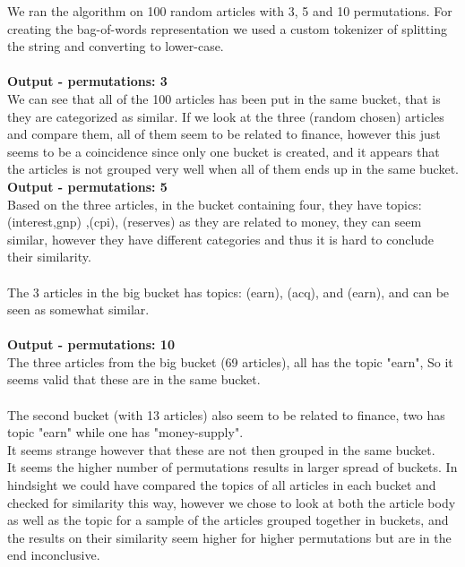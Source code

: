 \documentclass{article}
\begin{document}
We ran the algorithm on 100 random articles with 3, 5 and 10 permutations. For creating the bag-of-words representation we used a custom tokenizer of splitting the string and converting to lower-case.\\\\
\textbf{Output - permutations: 3}\\
We can see that all of the 100 articles has been put in the same bucket, that is they are categorized as similar. If we look at the three (random chosen) articles and compare them, all of them seem to be related to finance, however this just seems to be a coincidence since only one bucket is created, and it appears that the articles is not grouped very well when all of them ends up in the same bucket.\\

\textbf{Output - permutations: 5}\\
Based on the three articles, in the bucket containing four, they have topics: (interest,gnp) ,(cpi), (reserves) as they are related to money, they can seem similar, however they have different categories and thus it is hard to conclude their similarity.\\
~\\
The 3 articles in the big bucket has topics: (earn), (acq), and (earn), and can be seen as somewhat similar. \\
~\\
\textbf{Output - permutations: 10}\\
The three articles from the big bucket (69 articles), all has the topic "earn", So it seems valid that these are in the same bucket. \\
~\\
The second bucket (with 13 articles) also seem to be related to finance, two has topic "earn" while one has "money-supply". \\
It seems strange however that these are not then grouped in the same bucket.
~\\

It seems the higher number of permutations results in larger spread of buckets.
In hindsight we could have compared the topics of all articles in each bucket and checked for similarity this way, however we chose to look at both the article body as well as the topic for a sample of the articles grouped together in buckets, and the results on their similarity seem higher for higher permutations but are in the end inconclusive.
\end{document}
